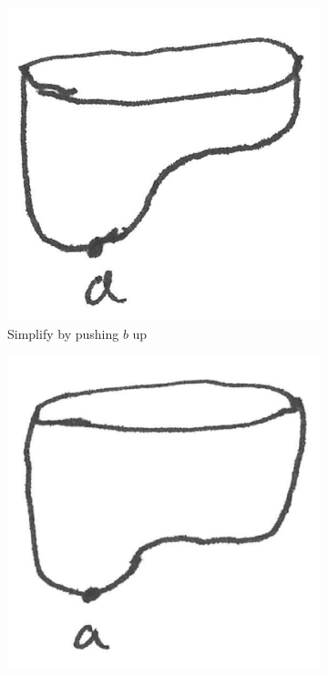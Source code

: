 \documentclass{article}
\begin{document}
\begin{figure}
\begin{subfigure}{0.24\columnwidth}
		\includegraphics[width=\textwidth]{fig/blobby-torus-bottom-reduced1}
		\caption{Simplify by pushing $b$ up}
	\end{subfigure}
	\begin{subfigure}{0.24\columnwidth}
		\centering
		\includegraphics[width=\textwidth]{fig/blobby-torus-bottom-reduced2}

\end{subfigure}
\end{figure}
\end{document}
